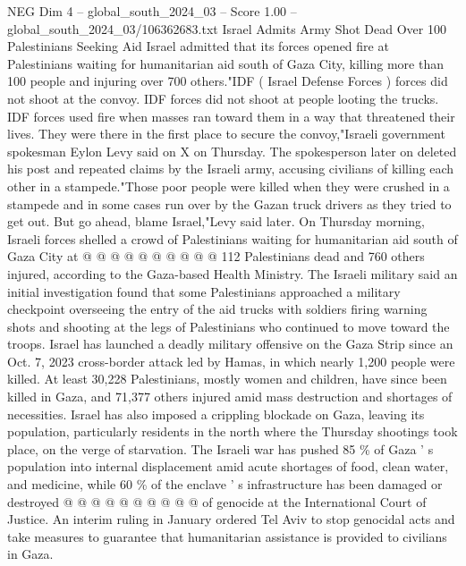 \begin{textsample}{NEG Dim 4 – global\_south\_2024\_03 – Score 1.00 – global\_south\_2024\_03/106362683.txt}  \label{ex:f4_neg_355}
Israel Admits Army Shot Dead Over 100 Palestinians Seeking Aid Israel admitted that its forces opened fire at Palestinians waiting for humanitarian aid south of Gaza City, killing more than 100 people and injuring over 700 others."IDF ( Israel Defense Forces ) forces did not shoot at the convoy.
IDF forces did not shoot at people looting the trucks.
IDF forces used fire when masses ran toward them in a way that threatened their lives.
They were there in the first place to secure the convoy,"Israeli government spokesman Eylon Levy said on X on Thursday.
The spokesperson later on deleted his post and repeated claims by the Israeli army, accusing civilians of killing each other in a stampede."Those poor people were killed when they were crushed in a stampede and in some cases run over by the Gazan truck drivers as they tried to get out.
But go ahead, blame Israel,"Levy said later.
On Thursday morning, Israeli forces shelled a crowd of Palestinians waiting for humanitarian aid south of Gaza City at @ @ @ @ @ @ @ @ @ @ 112 Palestinians dead and 760 others injured, according to the Gaza-based Health Ministry.
The Israeli military said an initial investigation found that some Palestinians approached a military checkpoint overseeing the entry of the aid trucks with soldiers firing warning shots and shooting at the legs of Palestinians who continued to move toward the troops.
Israel has launched a deadly military offensive on the Gaza Strip since an Oct. 7, 2023 cross-border attack led by Hamas, in which nearly 1,200 people were killed.
At least 30,228 Palestinians, mostly women and children, have since been killed in Gaza, and 71,377 others injured amid mass destruction and shortages of necessities.
Israel has also imposed a crippling blockade on Gaza, leaving its population, particularly residents in the north where the Thursday shootings took place, on the verge of starvation.
The Israeli war has pushed 85 \% of Gaza ' s population into internal displacement amid acute shortages of food, clean water, and medicine, while 60 \% of the enclave ' s infrastructure has been damaged or destroyed @ @ @ @ @ @ @ @ @ @ of genocide at the International Court of Justice.
An interim ruling in January ordered Tel Aviv to stop genocidal acts and take measures to guarantee that humanitarian assistance is provided to civilians in Gaza.

\end{textsample}
